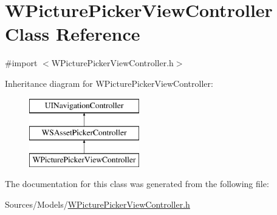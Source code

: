\hypertarget{interface_w_picture_picker_view_controller}{\section{W\-Picture\-Picker\-View\-Controller Class Reference}
\label{interface_w_picture_picker_view_controller}
}


{\ttfamily \#import $<$W\-Picture\-Picker\-View\-Controller.\-h$>$}

Inheritance diagram for W\-Picture\-Picker\-View\-Controller\-:\begin{figure}[H]
\begin{center}
\leavevmode
\includegraphics[height=3.000000cm]{interface_w_picture_picker_view_controller}
\end{center}
\end{figure}


The documentation for this class was generated from the following file\-:\begin{DoxyCompactItemize}
\item 
Sources/\-Models/\hyperlink{_w_picture_picker_view_controller_8h}{W\-Picture\-Picker\-View\-Controller.\-h}\end{DoxyCompactItemize}
